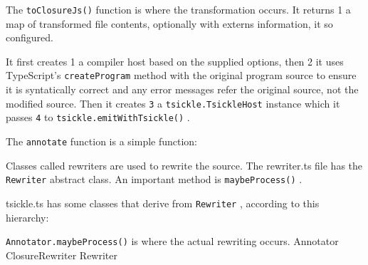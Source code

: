 The
\texttt{toClosureJs()}
function is where the transformation occurs. It returns
1
a map of
transformed file contents, optionally with externs information, it so configured.



It first creates
1
a compiler host based on the supplied options, then
2
it uses
TypeScript’s
\texttt{createProgram}
method with the original program source to ensure it is
syntatically correct and any error messages refer the original source, not the modified
source. Then it creates
\texttt{3}
a
\texttt{tsickle.TsickleHost}
instance which it passes
\texttt{4}
to
\texttt{tsickle.emitWithTsickle()}
.

The
\texttt{annotate}
function is a simple function:



Classes called rewriters are used to rewrite the source. The rewriter.ts file has the
\texttt{Rewriter}
abstract class. An important method is
\texttt{maybeProcess()}
.



tsickle.ts has some classes that derive from
\texttt{Rewriter}
, according to this hierarchy:

\texttt{Annotator.maybeProcess()}
is where the actual rewriting occurs.
Annotator
ClosureRewriter
Rewriter
